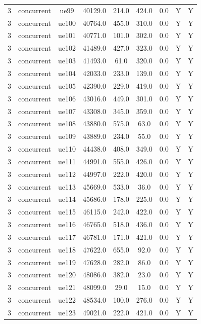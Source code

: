 \begin{table}[ht]
\begin{tabular}{|c|c|c|c|c|c|c|c|c|}
3 & concurrent & ue99 & 40129.0 & 214.0 & 424.0 & 0.0 & Y & Y \\
3 & concurrent & ue100 & 40764.0 & 455.0 & 310.0 & 0.0 & Y & Y \\
3 & concurrent & ue101 & 40771.0 & 101.0 & 302.0 & 0.0 & Y & Y \\
3 & concurrent & ue102 & 41489.0 & 427.0 & 323.0 & 0.0 & Y & Y \\
3 & concurrent & ue103 & 41493.0 & 61.0 & 320.0 & 0.0 & Y & Y \\
3 & concurrent & ue104 & 42033.0 & 233.0 & 139.0 & 0.0 & Y & Y \\
3 & concurrent & ue105 & 42390.0 & 229.0 & 419.0 & 0.0 & Y & Y \\
3 & concurrent & ue106 & 43016.0 & 449.0 & 301.0 & 0.0 & Y & Y \\
3 & concurrent & ue107 & 43308.0 & 345.0 & 359.0 & 0.0 & Y & Y \\
3 & concurrent & ue108 & 43880.0 & 575.0 & 63.0 & 0.0 & Y & Y \\
3 & concurrent & ue109 & 43889.0 & 234.0 & 55.0 & 0.0 & Y & Y \\
3 & concurrent & ue110 & 44438.0 & 408.0 & 349.0 & 0.0 & Y & Y \\
3 & concurrent & ue111 & 44991.0 & 555.0 & 426.0 & 0.0 & Y & Y \\
3 & concurrent & ue112 & 44997.0 & 222.0 & 420.0 & 0.0 & Y & Y \\
3 & concurrent & ue113 & 45669.0 & 533.0 & 36.0 & 0.0 & Y & Y \\
3 & concurrent & ue114 & 45686.0 & 178.0 & 225.0 & 0.0 & Y & Y \\
3 & concurrent & ue115 & 46115.0 & 242.0 & 422.0 & 0.0 & Y & Y \\
3 & concurrent & ue116 & 46765.0 & 518.0 & 436.0 & 0.0 & Y & Y \\
3 & concurrent & ue117 & 46781.0 & 171.0 & 421.0 & 0.0 & Y & Y \\
3 & concurrent & ue118 & 47622.0 & 655.0 & 92.0 & 0.0 & Y & Y \\
3 & concurrent & ue119 & 47628.0 & 282.0 & 86.0 & 0.0 & Y & Y \\
3 & concurrent & ue120 & 48086.0 & 382.0 & 23.0 & 0.0 & Y & Y \\
3 & concurrent & ue121 & 48099.0 & 29.0 & 15.0 & 0.0 & Y & Y \\
3 & concurrent & ue122 & 48534.0 & 100.0 & 276.0 & 0.0 & Y & Y \\
3 & concurrent & ue123 & 49021.0 & 222.0 & 421.0 & 0.0 & Y & Y \\

\end{tabular}
\end{table}
